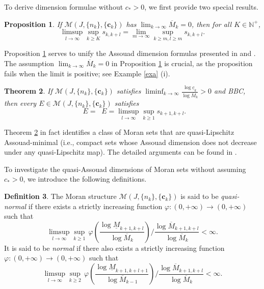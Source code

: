 \documentclass[12pt]{amsart}
\numberwithin{equation}{section}
\theoremstyle{plain}
\newtheorem{theorem}{Theorem}[section]
\newtheorem{proposition}[theorem]{Proposition}
\theoremstyle{remark}
\theoremstyle{definition}
\newtheorem{definition}[theorem]{Definition}
\newcommand{\om}{\overline{M}}
\newcommand{\um}{\underline{M}}
\newcommand{\N}{\mathbb{N}}
\newcommand{\ccc}{\mathbf{c}}
\newcommand{\f}{\frac}
\newcommand{\uc}{\underline{c}}
\renewcommand{\ge}{\geqslant}
\DeclareMathOperator{\dima}{dim_A}
\DeclareMathOperator{\dimqa}{dim_{qA}}
\begin{document}
	
	To derive  dimension formulae  without  $c_*>0$,  we  first provide two special results.

	\begin{proposition}\label{general}
If $\mathcal{M}(J,\{n_k\},\{\ccc_k\})$ has  $\lim_{k\to\infty}\om_k=0$, then  for all $K\in \N^+$,
		\[
		\limsup_{l\to\infty}\sup_{k\ge K} s_{k,k+l}=\lim_{m\to \infty}\sup_{k\ge m,l\ge m}s_{k,k+l}.
		\]
	\end{proposition}

Proposition \ref{general} serves to unify the Assouad dimension formulas presented in \cite{PENG2017192,yang2020assouad} and \cite{li2016assouad}. The assumption $\lim_{k\to\infty} \om_k = 0$ in Proposition \ref{general} is crucial, as the proposition fails when the limit is positive; see Example \ref{exa} (i).	

\begin{theorem}\label{WhenBNCisneeded}
If $\mathcal{M}(J,\{n_k\},\{\ccc_k\})$ satisfies $\liminf_{k\to\infty}\f{\log \uc_k}{\log \om_k}>0$ and BBC, then every  $E\in\mathcal{M}(J,\{n_k\},\{\ccc_k\})$ satisfies
		\[
		\dimqa E=\dima E=\limsup_{l\to\infty}\sup_{k\ge 1} s_{k+1,k+l}.
		\]
	\end{theorem}
 
	

Theorem \ref{WhenBNCisneeded} in fact identifies a class of Moran sets that are quasi-Lipschitz Assouad-minimal (i.e., compact sets whose Assouad dimension does not decrease under any quasi-Lipschitz map). The detailed arguments can be found in \cite{lu2016quasi}.

	
	
To investigate the quasi-Assouad dimensions of Moran sets without assuming $c_*>0$, we introduce the following definitions.
	\begin{definition}
The Moran structure $\mathcal{M}(J,\{n_k\},\{\ccc_k\})$ is said to be {\em quasi-normal } if there exists a strictly increasing function $\varphi:(0,+\infty)\to (0,+\infty)$ such that
		\[
		\limsup_{l\to \infty}\sup_{k\ge 1}\, \varphi\left(\frac{\log \um_{k+1,k+l}}{\log \om_{k}}\right)\bigg/\frac{\log \om_{k+1,k+l}}{\log \om_{k}}<\infty.
		\]
		It is said to be {\em normal} if there also exists a strictly increasing function $\varphi:(0,+\infty)\to (0,+\infty)$ such that
		 \[
		 \limsup_{l\to \infty}\sup_{k\ge 2}\, \varphi\left(\frac{\log \um_{k+1,k+l+1}}{\log \om_{k-1}}\right)\bigg/\frac{\log \om_{k+1,k+l}}{\log \om_{k}}<\infty.\]  


	\end{definition}
\end{document}
